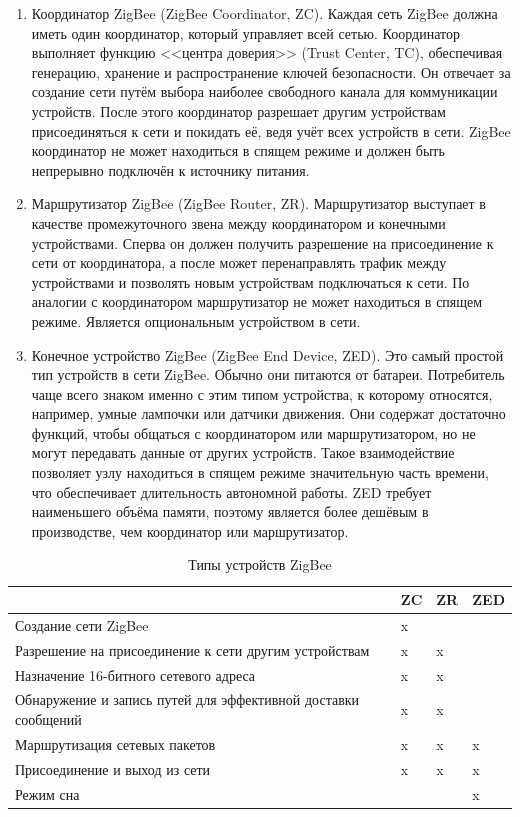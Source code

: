 	\begin{enumerate}
		\item Координатор ZigBee (ZigBee Coordinator, ZC). Каждая сеть ZigBee должна иметь один координатор,
		который управляет всей сетью. Координатор выполняет функцию <<центра доверия>> (Trust Center, TC),
		обеспечивая генерацию, хранение и распространение ключей безопасности. Он отвечает за создание сети
		путём выбора наиболее свободного канала для коммуникации устройств. После этого координатор 
		разрешает другим устройствам присоединяться к сети и покидать её, ведя учёт всех устройств в сети.
		ZigBee координатор не может находиться в спящем режиме и должен быть непрерывно подключён
		к источнику питания.
		\item Маршрутизатор ZigBee (ZigBee Router, ZR). Маршрутизатор выступает в качестве промежуточного
		звена между координатором и конечными устройствами. Сперва он должен получить разрешение на
		присоединение к сети от координатора, а после может перенаправлять трафик между устройствами и 
		позволять новым устройствам подключаться к сети. По аналогии с координатором маршрутизатор не
		может находиться в спящем режиме. Является опциональным устройством в сети.
		\item Конечное устройство ZigBee (ZigBee End Device, ZED). Это самый простой тип устройств в сети
		ZigBee. Обычно они питаются от батареи. Потребитель чаще всего знаком именно с этим типом
		устройства, к которому относятся, например, умные лампочки или датчики движения. Они содержат 
		достаточно функций, чтобы общаться с координатором или маршрутизатором, но не могут передавать 
		данные от других устройств. Такое взаимодействие позволяет узлу находиться в спящем режиме 
		значительную часть времени, что обеспечивает длительность автономной работы. ZED требует 
		наименьшего объёма памяти, поэтому является более дешёвым в производстве, чем координатор 
		или маршрутизатор.
	\end{enumerate}

	\begin{table}[h]
		\centering
		\caption{Типы устройств ZigBee}
		\begin{tabular}{ | p{9cm} | p{1cm} | p{1cm} | p{1cm} | }
			\hline
			& ZC & ZR & ZED \\ \hline
			Создание сети ZigBee & x &  &  \\ \hline
			Разрешение на присоединение к сети другим устройствам & x & x &  \\ \hline
			Назначение 16-битного сетевого адреса & x & x &  \\ \hline
			Обнаружение и запись путей для эффективной доставки сообщений & x & x &  \\ \hline
			Маршрутизация сетевых пакетов & x & x & x \\ \hline
			Присоединение и выход из сети & x & x & x \\ \hline
			Режим сна & & & x \\ \hline
		\end{tabular}
		\label{table-ZigBee-device-types}
	\end{table}
	
